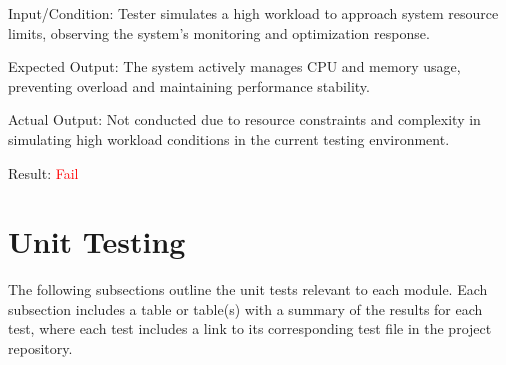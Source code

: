 \documentclass[12pt, titlepage]{article}
\begin{document}
\begin{enumerate}
Input/Condition: Tester simulates a high workload to approach system resource
limits, observing the system's monitoring and optimization response.
  
Expected Output: The system actively manages CPU and memory usage, preventing
overload and maintaining performance stability.

Actual Output: Not conducted due to resource constraints and complexity in
simulating high workload conditions in the current testing environment.

Result: \textcolor{red}{Fail}

\end{enumerate}

\section{Unit Testing}

The following subsections outline the unit tests relevant to each module. Each
subsection includes a table or table(s) with a summary of the results for each
test, where each test includes a link to its corresponding test file in the
project repository.
\end{document}
